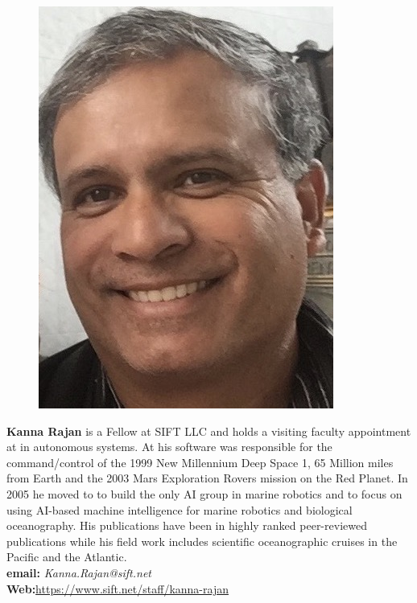 \parbox{6.3in}{
\begin{figure} %
    \vspace{-\intextsep}
    \hspace*{-.35\columnsep}\includegraphics[scale=0.4]{fig/KRajan.jpg}
\end{figure}
\textbf{Kanna Rajan} is a Fellow at SIFT LLC and holds a visiting
faculty appointment at \univ in autonomous systems. At \inst his
software was responsible for the command/control of the 1999 New
Millennium Deep Space 1, 65 Million miles from Earth and the 2003 Mars
Exploration Rovers mission on the Red Planet. In 2005 he moved to \mba
to build the only AI group in marine robotics and to focus on using
AI-based machine intelligence for marine robotics and biological
oceanography. His publications have been in highly ranked
peer-reviewed publications while his field work includes scientific
oceanographic cruises in the Pacific and the Atlantic.
\\
\textbf{email: }\emph{Kanna.Rajan@sift.net}\\
\textbf{Web:}\url{https://www.sift.net/staff/kanna-rajan} }

